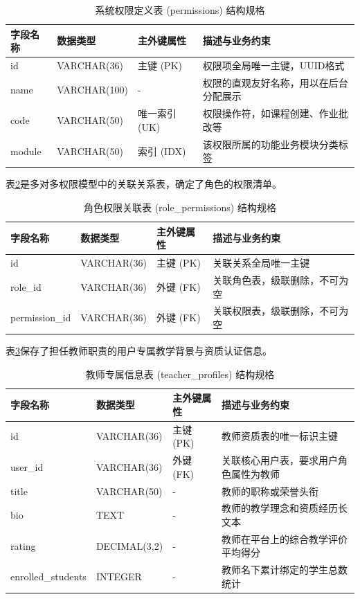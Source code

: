 \begin{table}[H]
\centering
\caption{系统权限定义表 (permissions) 结构规格}
\label{tab:db-permissions}
\begin{tabularx}{\textwidth}{lllX}
\toprule
字段名称 & 数据类型 & 主外键属性 & 描述与业务约束 \\
\midrule
id & VARCHAR(36) & 主键 (PK) & 权限项全局唯一主键，UUID格式 \\
name & VARCHAR(100) & - & 权限的直观友好名称，用以在后台分配展示 \\
code & VARCHAR(50) & 唯一索引 (UK) & 权限操作符，如课程创建、作业批改等 \\
module & VARCHAR(50) & 索引 (IDX) & 该权限所属的功能业务模块分类标签 \\
\bottomrule
\end{tabularx}
\end{table}

表\ref{tab:db-role-permissions}是多对多权限模型中的关联关系表，确定了角色的权限清单。

\begin{table}[H]
\centering
\caption{角色权限关联表 (role\_permissions) 结构规格}
\label{tab:db-role-permissions}
\begin{tabularx}{\textwidth}{lllX}
\toprule
字段名称 & 数据类型 & 主外键属性 & 描述与业务约束 \\
\midrule
id & VARCHAR(36) & 主键 (PK) & 关联关系全局唯一主键 \\
role\_id & VARCHAR(36) & 外键 (FK) & 关联角色表，级联删除，不可为空 \\
permission\_id & VARCHAR(36) & 外键 (FK) & 关联权限表，级联删除，不可为空 \\
\bottomrule
\end{tabularx}
\end{table}

表\ref{tab:db-teacher-profiles}保存了担任教师职责的用户专属教学背景与资质认证信息。

\begin{table}[H]
\centering
\caption{教师专属信息表 (teacher\_profiles) 结构规格}
\label{tab:db-teacher-profiles}
\begin{tabularx}{\textwidth}{lllX}
\toprule
字段名称 & 数据类型 & 主外键属性 & 描述与业务约束 \\
\midrule
id & VARCHAR(36) & 主键 (PK) & 教师资质表的唯一标识主键 \\
user\_id & VARCHAR(36) & 外键 (FK) & 关联核心用户表，要求用户角色属性为教师 \\
title & VARCHAR(50) & - & 教师的职称或荣誉头衔 \\
bio & TEXT & - & 教师的教学理念和资质经历长文本 \\
rating & DECIMAL(3,2) & - & 教师在平台上的综合教学评价平均得分 \\
enrolled\_students & INTEGER & - & 教师名下累计绑定的学生总数统计 \\
\bottomrule
\end{tabularx}
\end{table}

